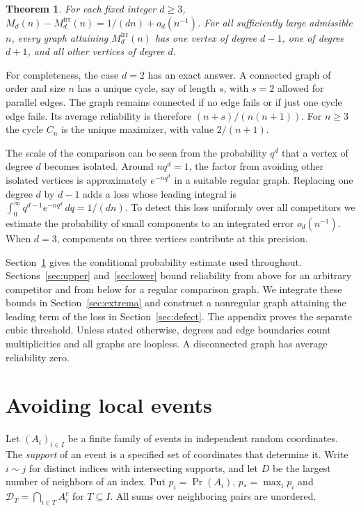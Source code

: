 \documentclass[11pt,reqno]{amsart}
\newtheorem{theorem}{Theorem}[section]
\theoremstyle{remark}
\numberwithin{equation}{section}
\newcommand{\avo}{\mathcal D}
\begin{document}
\begin{theorem}\label{thm:gap}
For each fixed integer $d\ge3$,
$M_d(n)-M_d^{\mathrm{irr}}(n)=1/(dn)+o_d(n^{-1})$.
For all sufficiently large admissible $n$, every graph attaining $M_d^{\mathrm{irr}}(n)$ has one vertex of degree $d-1$, one of degree $d+1$, and all other vertices of degree $d$.
\end{theorem}
For completeness, the case $d=2$ has an exact answer. A connected graph of order and size $n$ has a unique cycle, say of length $s$, with $s=2$ allowed for parallel edges. The graph remains connected if no edge fails or if just one cycle edge fails. Its average reliability is therefore $(n+s)/(n(n+1))$. For $n\ge3$ the cycle $C_n$ is the unique maximizer, with value $2/(n+1)$.

The scale of the comparison can be seen from the probability $q^d$ that a vertex of degree $d$ becomes isolated. Around $nq^d=1$, the factor from avoiding other isolated vertices is approximately $e^{-nq^d}$ in a suitable regular graph. Replacing one degree $d$ by $d-1$ adds a loss whose leading integral is $\int_0^\infty q^{d-1}e^{-nq^d}\,dq=1/(dn)$. To detect this loss uniformly over all competitors we estimate the probability of small components to an integrated error $o_d(n^{-1})$. When $d=3$, components on three vertices contribute at this precision.

Section~\ref{sec:local} gives the conditional probability estimate used throughout. Sections~\ref{sec:upper} and~\ref{sec:lower} bound reliability from above for an arbitrary competitor and from below for a regular comparison graph. We integrate these bounds in Section~\ref{sec:extrema} and construct a nonregular graph attaining the leading term of the loss in Section~\ref{sec:defect}. The appendix proves the separate cubic threshold. Unless stated otherwise, degrees and edge boundaries count multiplicities and all graphs are loopless. A disconnected graph has average reliability zero.

\section{Avoiding local events}\label{sec:local}
Let $(A_i)_{i\in I}$ be a finite family of events in independent random coordinates. The \emph{support} of an event is a specified set of coordinates that determine it. Write $i\sim j$ for distinct indices with intersecting supports, and let $D$ be the largest number of neighbors of an index. Put $p_i=\Pr(A_i)$, $p_*=\max_i p_i$ and $\avo_T=\bigcap_{i\in T} A_i^c$ for $T\subseteq I$. All sums over neighboring pairs are unordered.
\end{document}
